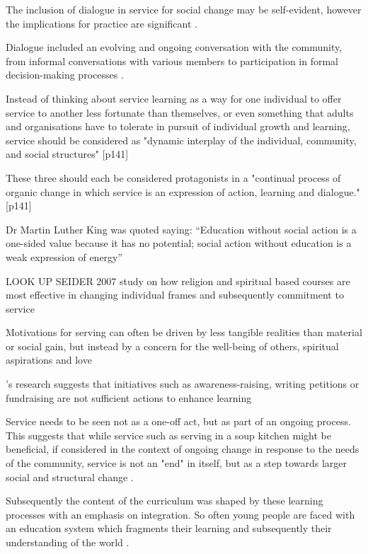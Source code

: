The inclusion of dialogue in service for social change may be self-evident, however the implications for practice are significant \citep{VanderDussen2009}.

Dialogue included an evolving and ongoing conversation with the community, from informal conversations with various members to participation in formal decision-making processes \citep{VanderDussen2009}.

Instead of thinking about service learning as a way for one individual to offer service to another less fortunate than themselves, or even something that adults and organisations have to tolerate in pursuit of individual growth and learning, service should be considered as "dynamic interplay of the individual, community, and social structures" [p141] \citep{VanderDussen2009}

These three should each be considered protagonists in a "continual process of organic change in which service is an expression of action, learning and dialogue."  \citep{VanderDussen2009}[p141]

Dr Martin Luther King was quoted saying: “Education without social action is a one-sided value because it has no potential; social action without education is a weak expression of energy” \citep[as quoted in][p437]{Claus2010}

LOOK UP SEIDER 2007 study on how religion and spiritual based courses are most effective in changing individual frames and subsequently commitment to service  \citep{VanderDussen2009}

Motivations for serving can often be driven by less tangible realities than material or social gain, but instead by a concern for the well-being of others, spiritual aspirations and love \citep{VanderDussen2009}



\citet{VanderDussen2009}'s research suggests that initiatives such as awareness-raising, writing petitions or fundraising are not sufficient actions to enhance learning

Service needs to be seen not as a one-off act, but as part of an ongoing process. This suggests that while service such as serving in a soup kitchen might be beneficial, if considered in the context of ongoing change in response to the needs of the community, service is not an "end" in itself, but as a step towards larger social and structural change \citep{VanderDussen2009}.



Subsequently the content of the curriculum was shaped by these learning processes with an emphasis on integration. So often young people are faced with an education system which fragments their learning and subsequently their understanding of the world \citep{Arbab2007}.

